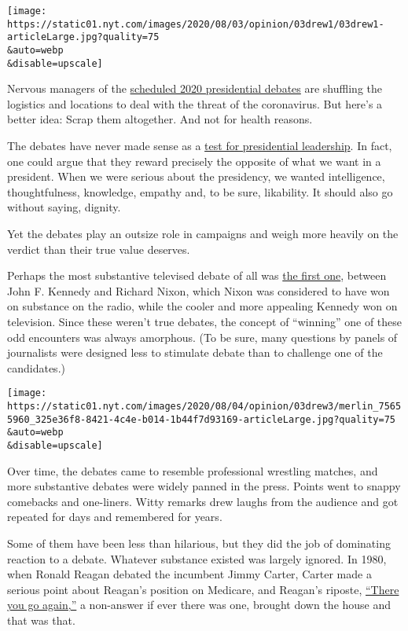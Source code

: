 \texttt{[image: https://static01.nyt.com/images/2020/08/03/opinion/03drew1/03drew1-articleLarge.jpg?quality=75\\\&auto=webp\\\&disable=upscale]}

Nervous managers of the
\href{https://ballotpedia.org/Presidential_debates,_2020}{scheduled 2020
presidential debates} are shuffling the logistics and locations to deal
with the threat of the coronavirus. But here's a better idea: Scrap them
altogether. And not for health reasons.

The debates have never made sense as a
\href{https://www.nytimes.com/2019/12/19/opinion/presidential-debate-alternatives.html}{test
for presidential leadership}. In fact, one could argue that they reward
precisely the opposite of what we want in a president. When we were
serious about the presidency, we wanted intelligence, thoughtfulness,
knowledge, empathy and, to be sure, likability. It should also go
without saying, dignity.

Yet the debates play an outsize role in campaigns and weigh more heavily
on the verdict than their true value deserves.

Perhaps the most substantive televised debate of all was
\href{https://learning.blogs.nytimes.com/2011/09/26/septe-26-1960-first-televised-presidential-debate/}{the
first one}, between John F. Kennedy and Richard Nixon, which Nixon was
considered to have won on substance on the radio, while the cooler and
more appealing Kennedy won on television. Since these weren't true
debates, the concept of ``winning'' one of these odd encounters was
always amorphous. (To be sure, many questions by panels of journalists
were designed less to stimulate debate than to challenge one of the
candidates.)

\texttt{[image: https://static01.nyt.com/images/2020/08/04/opinion/03drew3/merlin\_75655960\_325e36f8-8421-4c4e-b014-1b44f7d93169-articleLarge.jpg?quality=75\\\&auto=webp\\\&disable=upscale]}

Over time, the debates came to resemble professional wrestling matches,
and more substantive debates were widely panned in the press. Points
went to snappy comebacks and one-liners. Witty remarks drew laughs from
the audience and got repeated for days and remembered for years.

Some of them have been less than hilarious, but they did the job of
dominating reaction to a debate. Whatever substance existed was largely
ignored. In 1980, when Ronald Reagan debated the incumbent Jimmy Carter,
Carter made a serious point about Reagan's position on Medicare, and
Reagan's riposte,
\href{https://www.nytimes.com/politics/first-draft/2014/10/28/on-this-day-there-you-go-again/}{``There
you go again,''} a non-answer if ever there was one, brought down the
house and that was that.

